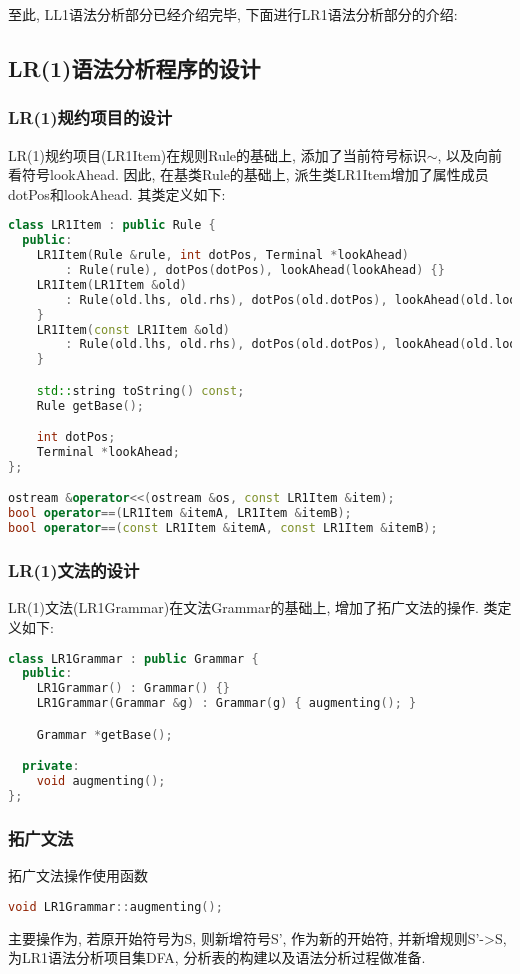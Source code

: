 至此, LL1语法分析部分已经介绍完毕, 下面进行LR1语法分析部分的介绍:

\subsection{LR(1)语法分析程序的设计}
\subsubsection{LR(1)规约项目的设计}
LR(1)规约项目(LR1Item)在规则Rule的基础上, 添加了当前符号标识$\sim$,
以及向前看符号lookAhead. 因此, 在基类Rule的基础上,
派生类LR1Item增加了属性成员dotPos和lookAhead.  其类定义如下:
\begin{lstlisting}[language=c++]
class LR1Item : public Rule {
  public:
    LR1Item(Rule &rule, int dotPos, Terminal *lookAhead)
        : Rule(rule), dotPos(dotPos), lookAhead(lookAhead) {}
    LR1Item(LR1Item &old)
        : Rule(old.lhs, old.rhs), dotPos(old.dotPos), lookAhead(old.lookAhead) {
    }
    LR1Item(const LR1Item &old)
        : Rule(old.lhs, old.rhs), dotPos(old.dotPos), lookAhead(old.lookAhead) {
    }

    std::string toString() const;
    Rule getBase();

    int dotPos;
    Terminal *lookAhead;
};

ostream &operator<<(ostream &os, const LR1Item &item);
bool operator==(LR1Item &itemA, LR1Item &itemB);
bool operator==(const LR1Item &itemA, const LR1Item &itemB);
\end{lstlisting}

\subsubsection{LR(1)文法的设计}
LR(1)文法(LR1Grammar)在文法Grammar的基础上, 增加了拓广文法的操作. 类定义如下:
\begin{lstlisting}[language=c++]
class LR1Grammar : public Grammar {
  public:
    LR1Grammar() : Grammar() {}
    LR1Grammar(Grammar &g) : Grammar(g) { augmenting(); }

    Grammar *getBase();

  private:
    void augmenting();
};
\end{lstlisting}

\subsubsection{拓广文法}
拓广文法操作使用函数
\begin{lstlisting}[language=c++]
void LR1Grammar::augmenting();
\end{lstlisting}
主要操作为, 若原开始符号为S, 则新增符号S', 作为新的开始符, 并新增规则S'->S,
为LR1语法分析项目集DFA, 分析表的构建以及语法分析过程做准备.

